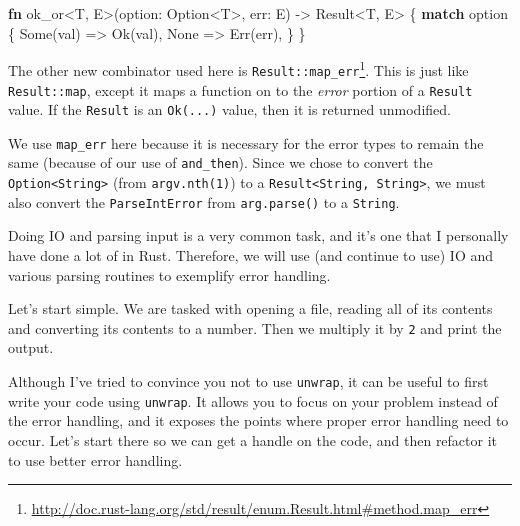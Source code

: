\documentclass[a4paper,]{book}
\newenvironment{Shaded}{\begin{snugshade}}{\end{snugshade}}
\newcommand{\KeywordTok}[1]{\textcolor[rgb]{0.13,0.29,0.53}{\textbf{{#1}}}}
\newcommand{\DataTypeTok}[1]{\textcolor[rgb]{0.13,0.29,0.53}{{#1}}}
\newcommand{\ConstantTok}[1]{\textcolor[rgb]{0.00,0.00,0.00}{{#1}}}
\newcommand{\NormalTok}[1]{{#1}}
\renewcommand{\href}[2]{#2\footnote{\url{#1}}}
\begin{document}
\begin{Shaded}
\begin{Highlighting}[]
\KeywordTok{fn} \NormalTok{ok_or<T, E>(option: }\DataTypeTok{Option}\NormalTok{<T>, err: E) -> }\DataTypeTok{Result}\NormalTok{<T, E> \{}
    \KeywordTok{match} \NormalTok{option \{}
        \ConstantTok{Some}\NormalTok{(val) => }\ConstantTok{Ok}\NormalTok{(val),}
        \ConstantTok{None} \NormalTok{=> }\ConstantTok{Err}\NormalTok{(err),}
    \NormalTok{\}}
\NormalTok{\}}
\end{Highlighting}
\end{Shaded}

The other new combinator used here is
\href{http://doc.rust-lang.org/std/result/enum.Result.html\#method.map_err}{\texttt{Result::map\_err}}.
This is just like \texttt{Result::map}, except it maps a function on to
the \emph{error} portion of a \texttt{Result} value. If the
\texttt{Result} is an \texttt{Ok(...)} value, then it is returned
unmodified.

We use \texttt{map\_err} here because it is necessary for the error
types to remain the same (because of our use of \texttt{and\_then}).
Since we chose to convert the
\texttt{Option\textless{}String\textgreater{}} (from
\texttt{argv.nth(1)}) to a
\texttt{Result\textless{}String,\ String\textgreater{}}, we must also
convert the \texttt{ParseIntError} from \texttt{arg.parse()} to a
\texttt{String}.


Doing IO and parsing input is a very common task, and it's one that I
personally have done a lot of in Rust. Therefore, we will use (and
continue to use) IO and various parsing routines to exemplify error
handling.

Let's start simple. We are tasked with opening a file, reading all of
its contents and converting its contents to a number. Then we multiply
it by \texttt{2} and print the output.

Although I've tried to convince you not to use \texttt{unwrap}, it can
be useful to first write your code using \texttt{unwrap}. It allows you
to focus on your problem instead of the error handling, and it exposes
the points where proper error handling need to occur. Let's start there
so we can get a handle on the code, and then refactor it to use better
error handling.
\end{document}
